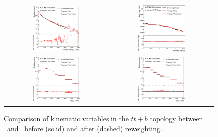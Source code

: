 \begin{figure}[p]
\begin{center}
\begin{tabular}{cc}
\includegraphics[width=0.48\textwidth]{Modeling/Figures/rw_tt1bq_q1_pt.eps} &
\includegraphics[width=0.48\textwidth]{Modeling/Figures/rw_tt1bq_q1_eta.eps} \\
\includegraphics[width=0.48\textwidth]{Modeling/Figures/rw_tt1bq_top_pt.eps} &
\includegraphics[width=0.48\textwidth]{Modeling/Figures/rw_tt1bq_ttbar_pt.eps} \\
\end{tabular}
\caption{Comparison of kinematic variables in the $t\bar{t}+b$ topology between \ShOL\ and \PP\ before (solid) and after (dashed) reweighting.}
\label{fig:default_tt1b_rw}
\end{center}
\end{figure}
